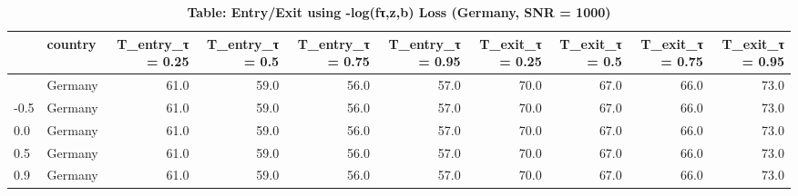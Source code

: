 \begin{table}[t]
\caption*{
{\large \textbf{Table: Entry/Exit using -log(fτ,z,b) Loss (Germany, SNR = 1000)}}
} 
\begin{tabular*}{\linewidth}{@{\extracolsep{\fill}}l|lrrrrrrrr}
\toprule
 & country & T\_entry\_τ = 0.25 & T\_entry\_τ = 0.5 & T\_entry\_τ = 0.75 & T\_entry\_τ = 0.95 & T\_exit\_τ = 0.25 & T\_exit\_τ = 0.5 & T\_exit\_τ = 0.75 & T\_exit\_τ = 0.95 \\ 
\midrule\addlinespace[2.5pt]
-0.9 & Germany & 61.0 & 59.0 & 56.0 & 57.0 & 70.0 & 67.0 & 66.0 & 73.0 \\ 
-0.5 & Germany & 61.0 & 59.0 & 56.0 & 57.0 & 70.0 & 67.0 & 66.0 & 73.0 \\ 
0.0 & Germany & 61.0 & 59.0 & 56.0 & 57.0 & 70.0 & 67.0 & 66.0 & 73.0 \\ 
0.5 & Germany & 61.0 & 59.0 & 56.0 & 57.0 & 70.0 & 67.0 & 66.0 & 73.0 \\ 
0.9 & Germany & 61.0 & 59.0 & 56.0 & 57.0 & 70.0 & 67.0 & 66.0 & 73.0 \\ 
\bottomrule
\end{tabular*}
\end{table}

